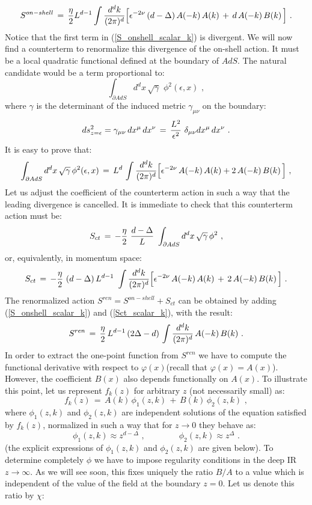 \documentclass[12pt,notitlepage]{article}
\newcommand{\beq}{\begin{equation}}
\newcommand{\eeq}{\end{equation}}
\begin{document}
\beq
S^{on-shell}\,=\,{\eta\over 2} L^{d-1}
\int {d^dk\over (2\pi)^d}\Big[
\epsilon^{-2\nu}\,(d-\Delta)\,A(-k)\,A(k)\,+\,d\,A(-k)\,B(k)\,\Big]\,\,.
\label{S_onshell_scalar_k}
\eeq
Notice that the first term in (\ref{S_onshell_scalar_k}) is divergent. We will now find a counterterm to renormalize this divergence of the on-shell action. It  must be a local quadratic functional defined at the boundary of $AdS$. The natural candidate would be a term proportional to:
\beq
\int_{\partial AdS} d^d x\, \sqrt{\gamma}\,\,\phi^2 (\epsilon, x)\,\,,
\eeq
where $\gamma$ is the determinant of the induced metric  $\gamma_{\mu\nu}$  on the boundary:
\beq
ds^2_{z=\epsilon}=\gamma_{\mu\nu}\,dx^{\mu}\,dx^{\nu}\,=\,
{L^2\over \epsilon^2}\,\,\delta_{\mu\nu} dx^{\mu}\,dx^{\nu}\,\,.
\eeq
It is easy to prove  that:
\beq
\int_{\partial AdS} d^d x\, \sqrt{\gamma}\,\phi^2 (\epsilon, x)\,=\,
L^d\,\int {d^dk\over (2\pi)^d}\Big[
\epsilon^{-2\nu}\,A(-k)\,A(k)+2\,A(-k)\,B(k)\,\Big]\,\,,
\eeq
Let us adjust the coefficient of the counterterm action in such a way that the leading divergence is cancelled. It is immediate to check that this counterterm action must be:
\beq
S_{ct}\,=\,-{\eta\over 2}\,\, {d-\Delta\over L}\,\,
\int_{\partial AdS} d^d x\, \sqrt{\gamma}\,\phi^2\,\,,
\eeq
or, equivalently, in momentum space:
\beq
S_{ct}\,=\,-{\eta\over 2}\,\, (d-\Delta)\, L^{d-1}\,\,
\int {d^dk\over (2\pi)^d}\Big[
\epsilon^{-2\nu}\,A(-k)\,A(k)\,+\,2\,A(-k)\,B(k)\,\Big]\,\,.
\label{Sct_scalar_k}
\eeq
The renormalized action $S^{ren}=S^{on-shell}+S_{ct}$  can be obtained by adding (\ref{S_onshell_scalar_k}) and (\ref{Sct_scalar_k}), with the result:
\beq
S^{ren}\,=\,{\eta\over 2}\, L^{d-1}\,(2\Delta-d)\,
\int {d^dk\over (2\pi)^d}\,A(-k)\,B(k)\,\,.
\label{Sren}
\eeq
In order to extract the one-point function from $S^{ren}$ we have to compute the functional derivative with respect to $\varphi(x)$(recall that $\varphi(x)=A(x)$). However, the coefficient $B(x)$ also depends functionally on $A(x)$. To illustrate this point,  let us represent $f_k(z)$ for arbitrary $z$ (not necessarily small) as:
\beq
f_k(z)\,=\,A(k)\,\phi_1(z,k)\,+\,B(k)\,\phi_2(z,k)\,\,,
\label{general_fk}
\eeq
where $\phi_1(z,k)$ and $\phi_2(z,k)$ are  independent solutions of the equation satisfied by $f_k(z)$, normalized in such a way that for $z\to 0$ they behave as:
\beq
\phi_1(z,k)\approx z^{d-\Delta}
\,\,,
\qquad\qquad
\phi_2(z,k)\approx z^{\Delta}\,\,.
\eeq
(the explicit expressions of  $\phi_1(z,k)$ and $\phi_2(z,k)$ are given below). To determine completely $\phi$ we have to impose regularity conditions in the deep IR $z\to\infty$. As we will see soon, this fixes uniquely the ratio $B/A$ to a value which is independent of the value of the field at the boundary $z=0$. Let us denote  this ratio by $\chi$:
\end{document}
